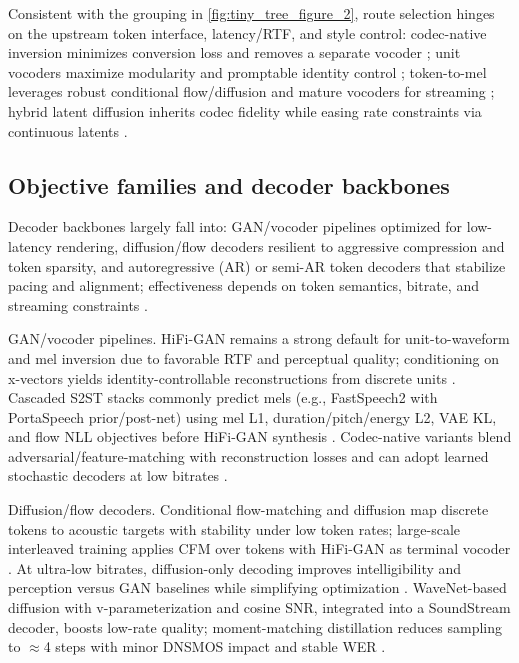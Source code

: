 \documentclass{article}
\begin{document}
Consistent with the grouping in \autoref{fig:tiny_tree_figure_2}, route selection hinges on the upstream token interface, latency/RTF, and style control: codec-native inversion minimizes conversion loss and removes a separate vocoder \cite{peng2024mslms2stmultitaskspeechlanguagemodeltext}; unit vocoders maximize modularity and promptable identity control \cite{ma2024languagemodelcanlistenwhilespeaking}; token-to-mel leverages robust conditional flow/diffusion and mature vocoders for streaming \cite{zeng2024scalingspeechtextpretrainingsyntheticint,wang2025tadicodectextawarediffusionspeechtokeniz}; hybrid latent diffusion inherits codec fidelity while easing rate constraints via continuous latents \cite{yang2025diffsoundstreamefficientspeechtokenizati}.

\subsection{Objective families and decoder backbones} \label{subsec:Objective families and decoder backbones}
Decoder backbones largely fall into: GAN/vocoder pipelines optimized for low-latency rendering, diffusion/flow decoders resilient to aggressive compression and token sparsity, and autoregressive (AR) or semi-AR token decoders that stabilize pacing and alignment; effectiveness depends on token semantics, bitrate, and streaming constraints \cite{li2024investigatingneuralaudiocodecsspeechlang,shen2024acousticbpespeechgenerationdiscretetoken,zhang2024speechtokenizerunifiedspeechtokenizerlar,yang2025diffsoundstreamefficientspeechtokenizati}.

GAN/vocoder pipelines. HiFi-GAN remains a strong default for unit-to-waveform and mel inversion due to favorable RTF and perceptual quality; conditioning on x-vectors yields identity-controllable reconstructions from discrete units \cite{nakata2024jchatjapaneselargescalespokendialoguecor}. Cascaded S2ST stacks commonly predict mels (e.g., FastSpeech2 with PortaSpeech prior/post-net) using mel L1, duration/pitch/energy L2, VAE KL, and flow NLL objectives before HiFi-GAN synthesis \cite{huang2023holisticcascadesystembenchmarkhumanevalu}. Codec-native variants blend adversarial/feature-matching with reconstruction losses and can adopt learned stochastic decoders at low bitrates \cite{yang2025diffsoundstreamefficientspeechtokenizati}.

Diffusion/flow decoders. Conditional flow-matching and diffusion map discrete tokens to acoustic targets with stability under low token rates; large-scale interleaved training applies CFM over tokens with HiFi-GAN as terminal vocoder \cite{zeng2024scalingspeechtextpretrainingsyntheticint}. At ultra-low bitrates, diffusion-only decoding improves intelligibility and perception versus GAN baselines while simplifying optimization \cite{wang2025tadicodectextawarediffusionspeechtokeniz}. WaveNet-based diffusion with v-parameterization and cosine SNR, integrated into a SoundStream decoder, boosts low-rate quality; moment-matching distillation reduces sampling to $\approx$4 steps with minor DNSMOS impact and stable WER \cite{yang2025diffsoundstreamefficientspeechtokenizati}.
\end{document}
